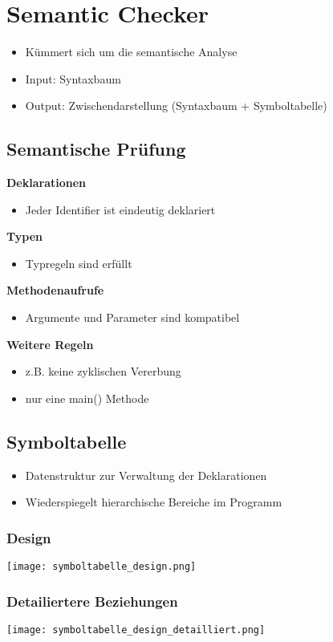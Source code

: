 \section{Semantic Checker}
\begin{itemize}
    \item Kümmert sich um die semantische Analyse
    \item Input: Syntaxbaum
    \item Output: Zwischendarstellung (Syntaxbaum + Symboltabelle)
\end{itemize}
\subsection{Semantische Prüfung}
\textbf{Deklarationen}
\begin{itemize}
    \item Jeder Identifier ist eindeutig deklariert
\end{itemize}
\textbf{Typen}
\begin{itemize}
    \item Typregeln sind erfüllt
\end{itemize}
\textbf{Methodenaufrufe}
\begin{itemize}
    \item Argumente und Parameter sind kompatibel
\end{itemize}
\textbf{Weitere Regeln}
\begin{itemize}
    \item z.B. keine zyklischen Vererbung
    \item nur eine main() Methode
\end{itemize}

\subsection{Symboltabelle}
\begin{itemize}
    \item Datenstruktur zur Verwaltung der Deklarationen
    \item Wiederspiegelt hierarchische Bereiche im Programm
\end{itemize}
\subsubsection{Design}
\texttt{[image: symboltabelle\_design.png]}
\subsubsection{Detailiertere Beziehungen}
\texttt{[image: symboltabelle\_design\_detailliert.png]}
